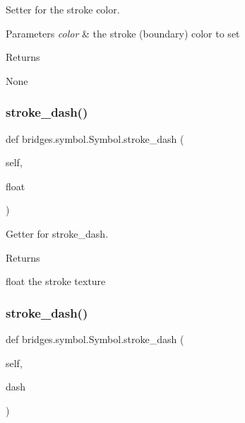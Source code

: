 Setter for the stroke color. 


\begin{DoxyParams}{Parameters}
{\em color} & the stroke (boundary) color to set \\
\hline
\end{DoxyParams}
\begin{DoxyReturn}{Returns}


None 
\end{DoxyReturn}
\mbox{\label{classbridges_1_1symbol_1_1_symbol_aeb388cf5a368e58ea10ecdd2ad7d3c10}} 
\subsubsection{\texorpdfstring{stroke\+\_\+dash()}{stroke\_dash()}\hspace{0.1cm}{\footnotesize\ttfamily [1/2]}}
{\footnotesize\ttfamily def bridges.\+symbol.\+Symbol.\+stroke\+\_\+dash (\begin{DoxyParamCaption}\item[{}]{self,  }\item[{}]{float }\end{DoxyParamCaption})}



Getter for stroke\+\_\+dash. 

\begin{DoxyReturn}{Returns}


float the stroke texture 
\end{DoxyReturn}
\mbox{\label{classbridges_1_1symbol_1_1_symbol_a1163b25841477c2fda6368fc05f4f79d}} 
\subsubsection{\texorpdfstring{stroke\+\_\+dash()}{stroke\_dash()}\hspace{0.1cm}{\footnotesize\ttfamily [2/2]}}
{\footnotesize\ttfamily def bridges.\+symbol.\+Symbol.\+stroke\+\_\+dash (\begin{DoxyParamCaption}\item[{}]{self,  }\item[{}]{dash }\end{DoxyParamCaption})}



